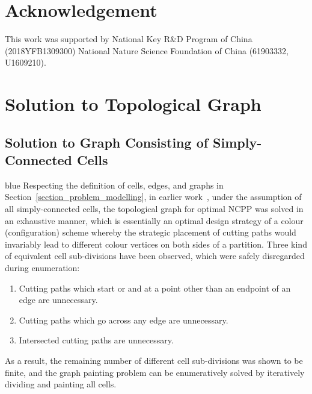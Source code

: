 \documentclass[Afour,sageh,times]{sagej}
\begin{document}
\section*{Acknowledgement}
This work was supported by National Key R\&D Program of China (2018YFB1309300) National Nature Science Foundation of China (61903332, U1609210).

\appendix
\section{Solution to Topological Graph}
\subsection{Solution to Graph Consisting of Simply-Connected Cells}

\begin{color}{blue}
Respecting the definition of cells, edges, and graphs in Section~\ref{section_problem_modelling}, 
in earlier work~\cite{Yang2020Cellular}, under the assumption of all simply-connected cells, the topological graph for optimal NCPP was solved in an exhaustive manner, which is essentially an optimal design strategy of a colour (configuration) scheme whereby the strategic placement of cutting paths would invariably lead to different colour vertices on both sides of a partition. Three kind of equivalent cell sub-divisions have been observed, which were safely disregarded during enumeration: 
\begin{enumerate}
\item Cutting paths which start or and at a point other than an endpoint of an edge are unnecessary. 
\item Cutting paths which go across any edge are unnecessary. 
\item Intersected cutting paths are unnecessary. 
\end{enumerate}

As a result, the remaining number of different cell sub-divisions was shown to be finite, and the graph painting problem can be enumeratively solved by iteratively dividing and painting all cells. 


\end{color}
\end{document}
